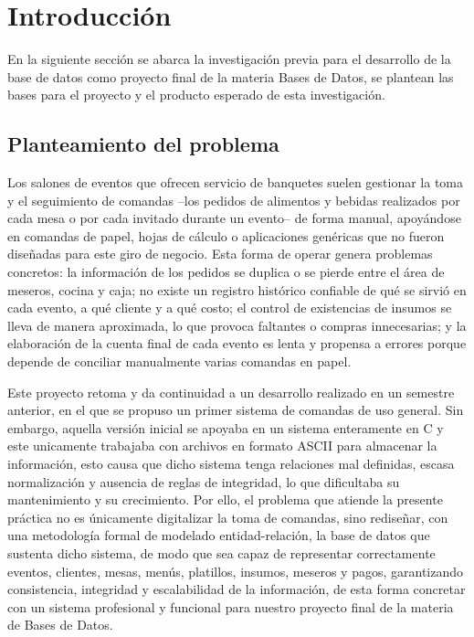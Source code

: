 \newpage

\section{Introducción}
\label{sec:introducción}

En la siguiente sección se abarca la investigación previa para el desarrollo de la base de datos como proyecto final de la materia Bases de Datos, se plantean las bases para el proyecto y el producto esperado de esta investigación.

\subsection{Planteamiento del problema}

Los salones de eventos que ofrecen servicio de banquetes suelen gestionar la toma y el seguimiento de comandas --los pedidos de alimentos y bebidas realizados por cada mesa o por cada invitado durante un evento-- de forma manual, apoyándose en comandas de papel, hojas de cálculo o aplicaciones genéricas que no fueron diseñadas para este giro de negocio. Esta forma de operar genera problemas concretos: la información de los pedidos se duplica o se pierde entre el área de meseros, cocina y caja; no existe un registro histórico confiable de qué se sirvió en cada evento, a qué cliente y a qué costo; el control de existencias de insumos se lleva de manera aproximada, lo que provoca faltantes o compras innecesarias; y la elaboración de la cuenta final de cada evento es lenta y propensa a errores porque depende de conciliar manualmente varias comandas en papel.

Este proyecto retoma y da continuidad a un desarrollo realizado en un semestre anterior, en el que se propuso un primer sistema de comandas de uso general. Sin embargo, aquella versión inicial se apoyaba en un sistema enteramente en C y este unicamente trabajaba con archivos en formato ASCII para almacenar la información, esto causa que dicho sistema tenga relaciones mal definidas, escasa normalización y ausencia de reglas de integridad, lo que dificultaba su mantenimiento y su crecimiento. Por ello, el problema que atiende la presente práctica no es únicamente digitalizar la toma de comandas, sino rediseñar, con una metodología formal de modelado entidad-relación, la base de datos que sustenta dicho sistema, de modo que sea capaz de representar correctamente eventos, clientes, mesas, menús, platillos, insumos, meseros y pagos, garantizando consistencia, integridad y escalabilidad de la información, de esta forma concretar con un sistema profesional y funcional para nuestro proyecto final de la materia de Bases de Datos.

